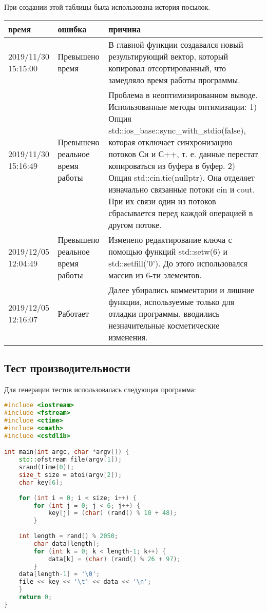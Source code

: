 \documentclass[12pt]{article}
\begin{document}
При создании этой таблицы была использована история посылок.
\begin{table}[!htb]
\begin{tabular}{|m{2cm}|m{3cm}|m{10cm}|}

\hline
\cellcolor{gray!25} время       & \cellcolor{gray!25} ошибка & \cellcolor{gray!25} причина\\ 
\hline
2019/11/30 15:15:00 & Превышено время & В главной функции создавался новый результирующий вектор, который копировал отсортированный, что замедляло время работы программы.\\ 
\hline
2019/11/30 15:16:49	& Превышено реальное время работы &  Проблема в неоптимизированном выводе. Использованные методы оптимизации: 1) Опция std::ios_base::sync_with_stdio(false), которая отключает синхронизацию потоков Си и С++, т. е. данные перестат копироваться из буфера в буфер. 2) Опция std::cin.tie(nullptr). Она отделяет изначально связанные потоки cin и cout. При их связи один из потоков сбрасывается перед каждой операцией в другом потоке.\\
\hline
2019/12/05 12:04:49	 & Превышено реальное время работы &   Изменено редактирование ключа с помощью функций std::setw(6) и std::setfill('0'). До этого использовался массив из 6-ти элементов. \\
\hline
2019/12/05 12:16:07	 & Работает & Далее убирались комментарии и лишние функции, используемые только для отладки программы, вводились незначительные косметические изменения. \\
\hline
\end{tabular}
\end{table}

\subsection*{Тест производительности}

Для генерации тестов использовалась следующая программа:
\begin{lstlisting}[language=C++]
#include <iostream>
#include <fstream>
#include <ctime>
#include <cmath>
#include <cstdlib>

int main(int argc, char *argv[]) {
    std::ofstream file(argv[1]);
    srand(time(0));
    size_t size = atoi(argv[2]);
    char key[6];
    
    for (int i = 0; i < size; i++) {
        for (int j = 0; j < 6; j++) {
            key[j] = (char) (rand() % 10 + 48);
        }
        
	int length = rand() % 2050;
        char data[length];
        for (int k = 0; k < length-1; k++) {
            data[k] = (char) (rand() % 26 + 97);
        }
	data[length-1] = '\0';
	file << key << '\t' << data << '\n';
    }
    return 0;
}
\end{lstlisting}
\end{document}

